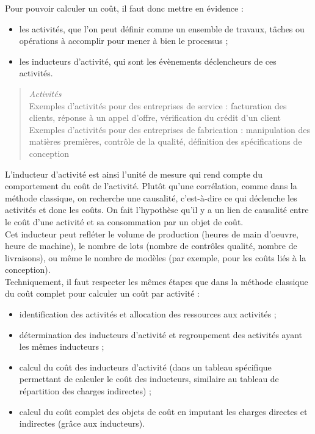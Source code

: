 \documentclass{kaobook}
\begin{document}
Pour pouvoir calculer un coût, il faut donc mettre en évidence :\\
\begin{itemize}
\item les activités, que l'on peut définir comme un ensemble de travaux, tâches ou opérations à accomplir pour mener à bien le processus ;\\
\item les inducteurs d'activité, qui sont les évènements déclencheurs de ces activités.\\
\end{itemize}

\begin{quote}
\emph{Activités}\\
Exemples d'activités pour des entreprises de service : facturation des clients, réponse à un appel d’offre, vérification du crédit d’un client\\
Exemples d'activités pour des entreprises de fabrication : manipulation des matières premières, contrôle de la qualité, définition des spécifications de conception\\
\end{quote}

L'inducteur d'activité est ainsi l'unité de mesure qui rend compte du comportement du coût de l’activité. Plutôt qu'une corrélation, comme dans la méthode classique, on recherche une causalité, c'est-à-dire ce qui déclenche les activités et donc les coûts. On fait l'hypothèse qu'il y a un lien de causalité entre le coût d’une activité et sa consommation par un objet de coût.\\

Cet inducteur peut refléter le volume de production (heures de main d'oeuvre, heure de machine), le nombre de lots (nombre de contrôles qualité, nombre de livraisons), ou même le nombre de modèles (par exemple, pour les coûts liés à la conception).\\

Techniquement, il faut respecter les mêmes étapes que dans la méthode classique du coût complet pour calculer un coût par activité :\\
\begin{itemize}
\item identification des activités et allocation des ressources aux activités ;\\
\item détermination des inducteurs d’activité et regroupement des activités ayant les mêmes inducteurs ;\\
\item calcul du coût des inducteurs d’activité (dans un tableau spécifique permettant de calculer le coût des inducteurs, similaire au tableau de répartition des charges indirectes) ;\\
\item calcul du coût complet des objets de coût en imputant les charges directes et indirectes (grâce aux inducteurs).\\
\end{itemize}
\end{document}
